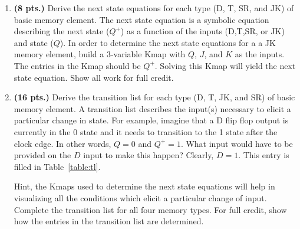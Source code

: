 \begin{enumerate}
\begin{table}[ht]
\end{table}
 
\item {\bf (8 pts.)} Derive the next state equations for each 
type (D, T, SR, and JK) of basic memory element.  The next state equation 
is a symbolic equation describing the next state ($Q^+$) 
as a function of the inputs (D,T,SR, or JK) and state ($Q$).
In order to determine the next state equations for a
a JK memory element, build a 3-variable Kmap with 
$Q$, $J$, and $K$ as the inputs.  The entries in the Kmap should 
be $Q^+$.  Solving this Kmap will yield the next state equation.
Show all work for full credit.

\item {\bf (16 pts.)} Derive the transition list for each
type (D, T, JK, and SR) of basic memory element.  A transition 
list describes the input(s) necessary to elicit a particular 
change in state.  For example, imagine that a D flip flop output
is currently in the 0 state and it needs to transition to 
the 1 state after the clock edge.  In other words, $Q=0$ and 
$Q^+ = 1$.  What input would have to be provided on the
$D$ input to make this happen?  Clearly, $D=1$.  This entry
is filled in Table~\ref{table:tl}.

Hint, the Kmaps used to determine the next state equations
will help in visualizing all the conditions which elicit 
a particular change of input.  Complete the transition list 
for all four memory types.  For full credit, show how the
entries in the transition list are determined.

\begin{table}[ht]
\end{table}
\end{enumerate}
